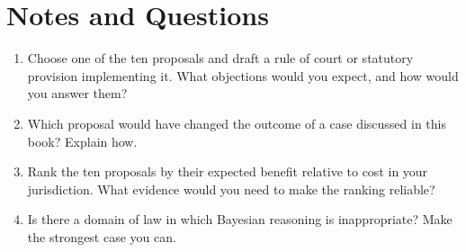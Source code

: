 \section*{Notes and Questions}
\begin{enumerate}[label=\arabic*.]
\item Choose one of the ten proposals and draft a rule of court or statutory provision implementing it. What objections would you expect, and how would you answer them?
\item Which proposal would have changed the outcome of a case discussed in this book? Explain how.
\item Rank the ten proposals by their expected benefit relative to cost in your jurisdiction. What evidence would you need to make the ranking reliable?
\item Is there a domain of law in which Bayesian reasoning is inappropriate? Make the strongest case you can.
\end{enumerate}
